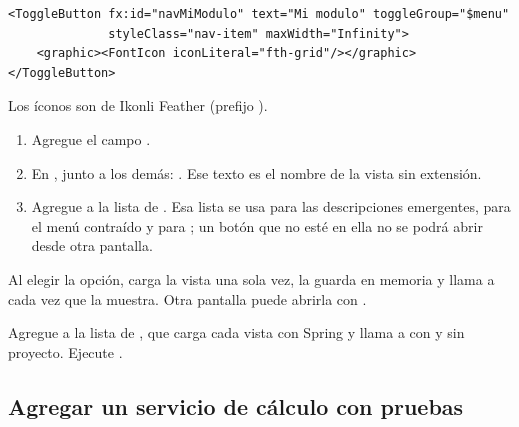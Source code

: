 \begin{verbatim}
<ToggleButton fx:id="navMiModulo" text="Mi modulo" toggleGroup="$menu"
              styleClass="nav-item" maxWidth="Infinity">
    <graphic><FontIcon iconLiteral="fth-grid"/></graphic>
</ToggleButton>
\end{verbatim}

Los íconos son de Ikonli Feather (prefijo ).

\par\medskip\noindent{}\par\nopagebreak\smallskip

\begin{enumerate}
	\item Agregue el campo .
	\item En , junto a los demás: . Ese texto es
	      el nombre de la vista sin extensión.
	\item Agregue  a la lista de . Esa lista se usa para las
	      descripciones emergentes, para el menú contraído y para ; un botón que no esté en ella
	      no se podrá abrir desde otra pantalla.
\end{enumerate}

Al elegir la opción,  carga la vista una sola vez, la guarda en memoria y llama a
 cada vez que la muestra. Otra pantalla puede abrirla con
.

\par\medskip\noindent{}\hspace{0.5em}{\bfseries Agregar la vista a la prueba de humo}\par\nopagebreak\smallskip

Agregue  a la lista  de , que carga cada vista con Spring y
llama a  con y sin proyecto. Ejecute .

\subsection{Agregar un servicio de cálculo con pruebas}
\label{sec:amp-calculo}

